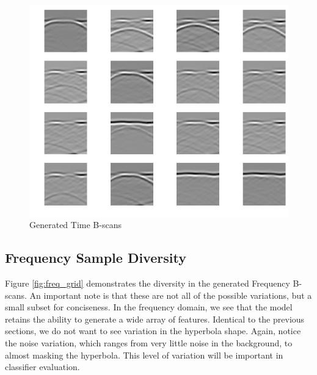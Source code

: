 \begin{figure}[H]
    \centering
    \includegraphics[width=\linewidth]{figures/generated_grid.png}
    \caption{Generated Time B-scans}
    \label{fig:grid}
\end{figure}

\subsection{Frequency Sample Diversity}
Figure \ref{fig:freq_grid} demonstrates the diversity in the generated Frequency B-scans. An important note is that these are not all of the possible variations, but a small subset for conciseness. In the frequency domain, we see that the model retains the ability to generate a wide array of features. Identical to the previous sections, we do not want to see variation in the hyperbola shape. Again, notice the noise variation, which ranges from very little noise in the background, to almost masking the hyperbola. This level of variation will be important in classifier evaluation.

